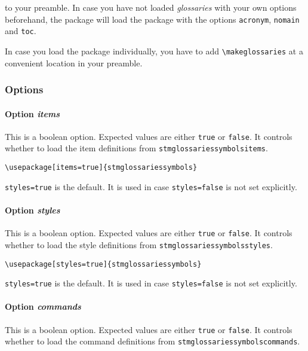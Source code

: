 \documentclass[%
  type=article,%
  layout=koma,%
  hyperref=true,%
  conditionallox=true,%
  conditionalloxnewpage=false,%
  date=true,%
  index=true,%
  listings=true%
]{stmtext}
\begin{document}
to your preamble. In case you have not loaded \textit{glossaries} with your own options beforehand, the package will load the package with the options \texttt{acronym}, \texttt{nomain} and \texttt{toc}.

In case you load the package individually, you have to add \texttt{\textbackslash makeglossaries} at a convenient location in your preamble.

\subsubsection{Options}

\paragraph{Option \protect\textit{items}}

This is a boolean option. Expected values are either \texttt{true} or \texttt{false}. It controls whether to load the item definitions from \texttt{stmglossariessymbolsitems}.

\begin{verbatim}
\usepackage[items=true]{stmglossariessymbols}
\end{verbatim}

\texttt{styles=true} is the default. It is used in case \texttt{styles=false} is not set explicitly.

\paragraph{Option \protect\textit{styles}}

This is a boolean option. Expected values are either \texttt{true} or \texttt{false}. It controls whether to load the style definitions from \texttt{stmglossariessymbolsstyles}.

\begin{verbatim}
\usepackage[styles=true]{stmglossariessymbols}
\end{verbatim}

\texttt{styles=true} is the default. It is used in case \texttt{styles=false} is not set explicitly.

\paragraph{Option \protect\textit{commands}}

This is a boolean option. Expected values are either \texttt{true} or \texttt{false}. It controls whether to load the command definitions from \texttt{stmglossariessymbolscommands}.
\end{document}
